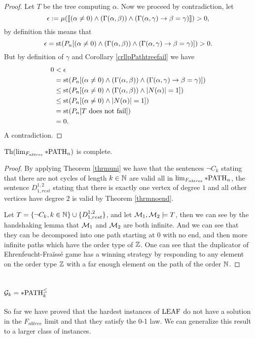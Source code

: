 \begin{proof}
Let $T$ be the tree computing $\alpha$. Now we proceed by contradiction, let
\[\epsilon:=\mu(\llbracket(\alpha\not=0)\land (\Gamma(\alpha,\beta)) \land(\Gamma(\alpha,\gamma) \to \beta=\gamma)\rrbracket)>0,\]
by definition this means that
\[\epsilon=\text{st}(P_n[(\alpha\not=0)\land (\Gamma(\alpha,\beta)) \land(\Gamma(\alpha,\gamma) \to \beta=\gamma)])>0.\]
But by definition of $\gamma$ and Corollary \ref{crllpPathtreefail} we have
\begin{align*}
0&<\epsilon\\
&=\text{st}(P_n[(\alpha\not=0)\land (\Gamma(\alpha,\beta)) \land(\Gamma(\alpha,\gamma) \to \beta=\gamma)])\\
&\leq\text{st}(P_n[(\alpha\not=0)\land (\Gamma(\alpha,\beta)) \land \left|{N(\alpha)}\right|=1])\\
&\leq\text{st}(P_n[(\alpha\not=0)\land \left|{N(\alpha)}\right|=1])\\
&=\text{st}(P_n[T\text{ does not fail}])\\
&=0.
\end{align*}
A contradiction.
\end{proof}

\begin{crll}
$\text{Th}(\lim_{F_{nbtree}}*\text{PATH}_n)$ is complete.
\end{crll}
\begin{proof}
By applying Theorem \ref{thrmuni} we have that the sentences $\lnot C_k$ stating that there are not cycles of length $k\in\mathbb{N}$ are valid all in $\lim_{F_{nbtree}}*\text{PATH}_n$, the sentence $D^{1,2}_{1,rest}$ stating that there is exactly one vertex of degree $1$ and all other vertices have degree $2$ is valid by Theorem \ref{thrmnoend}. 

Let $T=\{\lnot C_k,k\in\mathbb{N}\}\cup\{D_{1,rest}^{1,2}\}$, and let $\mathcal{M}_1,\mathcal{M}_2\models T$, then we can see by the handshaking lemma that $\mathcal{M}_1$ and $\mathcal{M}_2$ are both infinite. And we can see that they can be decomposed into one path starting at $0$ with no end, and then more infinite paths which have the order type of $\mathbb{Z}$. One can see that the duplicator of Ehrenfeucht-Fraïssé game has a winning strategy by responding to any element on the order type $\mathbb{Z}$ with a far enough element on the path of the order $\mathbb{N}$.
\end{proof}

\section{$\mathcal{G}_k=*\text{PATH}^\leq_k$}

So far we have proved that the hardest instances of $\text{LEAF}$ do not have a solution in the $F_{nbtree}$ limit and that they satisfy the 0-1 law. We can generalize this result to a larger class of instances.

